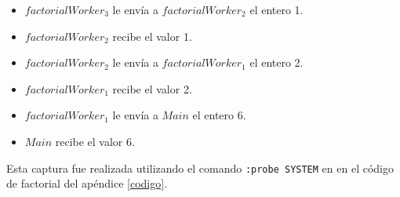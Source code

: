 \begin{itemize}
\item $factorialWorker_3$ le envía a $factorialWorker_2$ el entero 1.
\item $factorialWorker_2$ recibe el valor 1.

\item $factorialWorker_2$ le envía a $factorialWorker_1$ el entero 2.
\item $factorialWorker_1$ recibe el valor 2.

\item $factorialWorker_1$ le envía a $Main$ el entero 6.
\item $Main$ recibe el valor 6.

\end{itemize}

Esta captura fue realizada utilizando el comando \verb=:probe SYSTEM= en \FDR en el código de factorial del apéndice \ref{codigo}.




